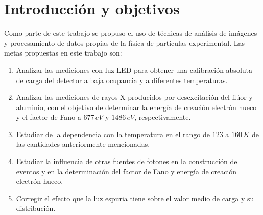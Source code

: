 \newpage
{}  %
\setcounter{page}{1}    %

\chapter{Introducción y objetivos}

\noindent Como parte de este trabajo se propuso el uso de técnicas de análisis de imágenes y procesamiento de datos propias de la física de partículas experimental. %
Las metas propuestas en este trabajo son:
\begin{enumerate}
    \item Analizar las mediciones con luz LED para obtener una calibración absoluta de carga del detector a baja ocupancia y a diferentes temperaturas.
    \item Analizar las mediciones de rayos X producidos por desexcitación del flúor y aluminio, con el objetivo de determinar la energía de creación electrón hueco y el factor de Fano a $677\,\si{eV}$ y $1486\,\si{eV}$, respectivamente.
    \item Estudiar de la dependencia con la temperatura en el rango de $123$ a $160\,\si{K}$ de las cantidades anteriormente mencionadas.
    \item Estudiar la influencia de otras fuentes de fotones en la construcción de eventos y en la determinación del factor de Fano y energía de creación electrón hueco.
    \item Corregir el efecto que la luz espuria tiene sobre el valor medio de carga y su distribución.
\end{enumerate}

